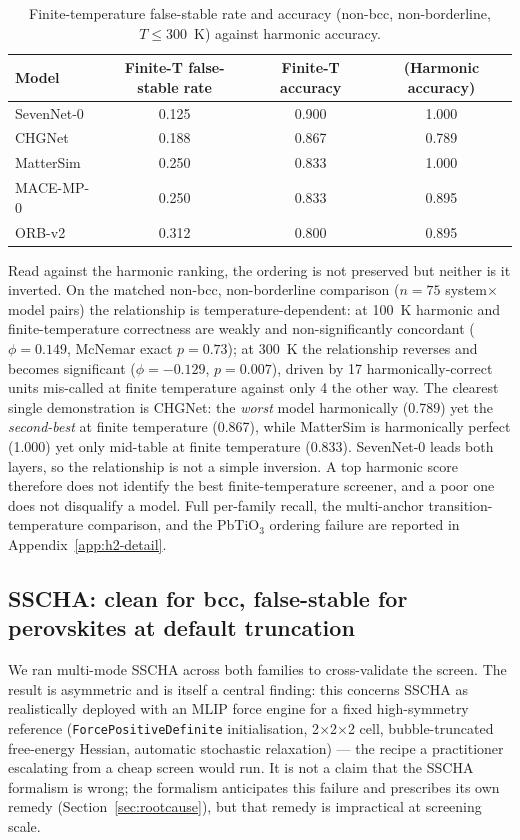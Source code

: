 \documentclass{article}
\begin{document}
\begin{table}[h]
\caption{Finite-temperature false-stable rate and accuracy (non-bcc, non-borderline, $T\le300$~K) against harmonic accuracy.}
\label{tab:finiteT}
\centering
\small
\begin{tabular}{lccc}
\toprule
Model & Finite-T false-stable rate & Finite-T accuracy & (Harmonic accuracy) \\
\midrule
SevenNet-0 & 0.125 & 0.900 & 1.000 \\
CHGNet & 0.188 & 0.867 & 0.789 \\
MatterSim & 0.250 & 0.833 & 1.000 \\
MACE-MP-0 & 0.250 & 0.833 & 0.895 \\
ORB-v2 & 0.312 & 0.800 & 0.895 \\
\bottomrule
\end{tabular}
\end{table}

Read against the harmonic ranking, the ordering is not preserved but neither is it inverted. On the matched non-bcc, non-borderline comparison ($n=75$ system$\times$model pairs) the relationship is temperature-dependent: at 100~K harmonic and finite-temperature correctness are weakly and non-significantly concordant ($\phi=0.149$, McNemar exact $p=0.73$); at 300~K the relationship reverses and becomes significant ($\phi=-0.129$, $p=0.007$), driven by 17 harmonically-correct units mis-called at finite temperature against only 4 the other way. The clearest single demonstration is CHGNet: the \emph{worst} model harmonically (0.789) yet the \emph{second-best} at finite temperature (0.867), while MatterSim is harmonically perfect (1.000) yet only mid-table at finite temperature (0.833). SevenNet-0 leads both layers, so the relationship is not a simple inversion. A top harmonic score therefore does not identify the best finite-temperature screener, and a poor one does not disqualify a model. Full per-family recall, the multi-anchor transition-temperature comparison, and the PbTiO$_3$ ordering failure are reported in Appendix~\ref{app:h2-detail}.

\subsection{SSCHA: clean for bcc, false-stable for perovskites at default truncation}
\label{sec:sscha}

We ran multi-mode SSCHA across both families to cross-validate the screen. The result is asymmetric and is itself a central finding: this concerns SSCHA as realistically deployed with an MLIP force engine for a fixed high-symmetry reference (\texttt{ForcePositiveDefinite} initialisation, 2$\times$2$\times$2 cell, bubble-truncated free-energy Hessian, automatic stochastic relaxation) --- the recipe a practitioner escalating from a cheap screen would run. It is not a claim that the SSCHA formalism is wrong; the formalism anticipates this failure and prescribes its own remedy (Section~\ref{sec:rootcause}), but that remedy is impractical at screening scale.
\end{document}
